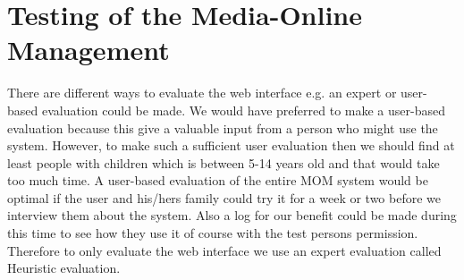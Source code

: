 \chapter{Testing of the Media-Online Management}
There are different ways to evaluate the web interface e.g. an expert or user-based evaluation could be made. We would have preferred to make a user-based evaluation because this give a valuable input from a person who might use the system. However, to make such a sufficient user evaluation then we should find at least people with children which is between 5-14 years old and that would take too much time. A user-based evaluation of the entire MOM system would be optimal if the user and his/hers family could try it for a week or two before we interview them about the system. Also a log for our benefit could be made during this time to see how they use it of course with the test persons permission. Therefore to only evaluate the web interface we use an expert evaluation called Heuristic evaluation. 

